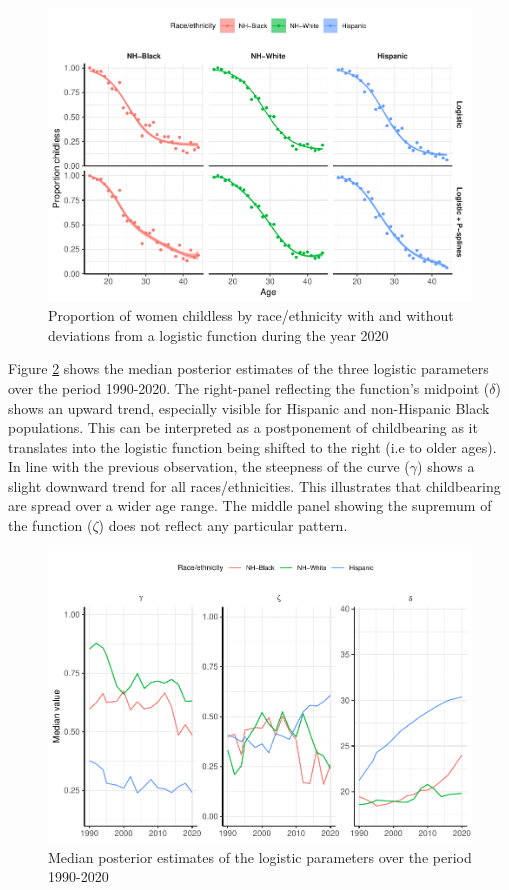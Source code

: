 \documentclass[
  11pt,
  letterpaper,
]{article}
\begin{document}
\begin{figure}[H]
\includegraphics{childlessness_paa_ext_abstract_files/figure-latex/race-fit-1} \caption{Proportion of women childless by race/ethnicity with and without deviations from a logistic function during the year 2020}\label{fig:race-fit}
\end{figure}

Figure \ref{fig:pars-race} shows the median posterior estimates of the three logistic parameters over the period 1990-2020. The right-panel reflecting the function's midpoint (\(\delta\)) shows an upward trend, especially visible for Hispanic and non-Hispanic Black populations. This can be interpreted as a postponement of childbearing as it translates into the logistic function being shifted to the right (i.e to older ages). In line with the previous observation, the steepness of the curve (\(\gamma\)) shows a slight downward trend for all races/ethnicities. This illustrates that childbearing are spread over a wider age range. The middle panel showing the supremum of the function (\(\zeta\)) does not reflect any particular pattern.

\begin{figure}[H]
\includegraphics{childlessness_paa_ext_abstract_files/figure-latex/pars-race-1} \caption{Median posterior estimates of the logistic parameters over the period 1990-2020}\label{fig:pars-race}
\end{figure}
\end{document}
